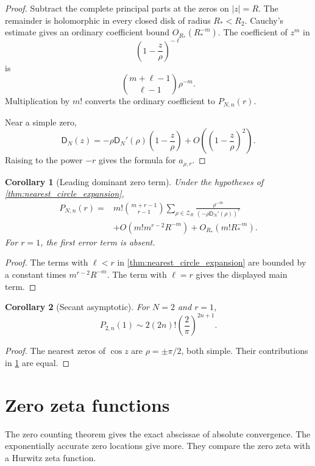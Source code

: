 \documentclass{aomart}
\newtheorem{corollary}[corollary]{Corollary}
\theoremstyle{definition}
\theoremstyle{remark}
\newcommand{\Zcal}{\mathcal Z}
\newcommand{\Dfun}{\mathsf D}
\begin{document}
\begin{proof}
Subtract the complete principal parts at the zeros on $|z|=R$.  The remainder is holomorphic in every closed disk of radius $R_*<R_2$.  Cauchy's estimate gives an ordinary coefficient bound $O_{R_*}(R_*^{-m})$.  The coefficient of $z^m$ in
\[
\left(1-\frac z\rho\right)^{-\ell}
\]
is
\[
\binom{m+\ell-1}{\ell-1}\rho^{-m}.
\]
Multiplication by $m!$ converts the ordinary coefficient to $P_{N,n}(r)$.

Near a simple zero,
\[
\Dfun_N(z)
=
-\rho\Dfun_N'(\rho)
\left(1-\frac z\rho\right)
+O\left(\left(1-\frac z\rho\right)^2\right).
\]
Raising to the power $-r$ gives the formula for $a_{\rho,r}$.
\end{proof}

\begin{corollary}[Leading dominant zero term]\label{cor:leading_dominant_zero}
Under the hypotheses of \cref{thm:nearest_circle_expansion},
\[
\begin{aligned}
P_{N,n}(r)
={}&m!\binom{m+r-1}{r-1}
\sum_{\rho\in\Zcal_R}
\frac{\rho^{-m}}{(-\rho\Dfun_N'(\rho))^r}
\\
&+O\left(m!m^{r-2}R^{-m}\right)
+O_{R_*}\left(m!R_*^{-m}\right).
\end{aligned}
\]
For $r=1$, the first error term is absent.
\end{corollary}

\begin{proof}
The terms with $\ell<r$ in \cref{thm:nearest_circle_expansion} are bounded by a constant times $m^{r-2}R^{-m}$.  The term with $\ell=r$ gives the displayed main term.
\end{proof}

\begin{corollary}[Secant asymptotic]\label{cor:secant_asymptotic}
For $N=2$ and $r=1$,
\[
P_{2,n}(1)
\sim
2(2n)!\left(\frac2\pi\right)^{2n+1}.
\]
\end{corollary}

\begin{proof}
The nearest zeros of $\cos z$ are $\rho=\pm\pi/2$, both simple.  Their contributions in \cref{cor:leading_dominant_zero} are equal.
\end{proof}

\section{Zero zeta functions}\label{sec:zero_zeta}

The zero counting theorem gives the exact abscissae of absolute convergence.  The exponentially accurate zero locations give more.  They compare the zero zeta with a Hurwitz zeta function.
\end{document}
